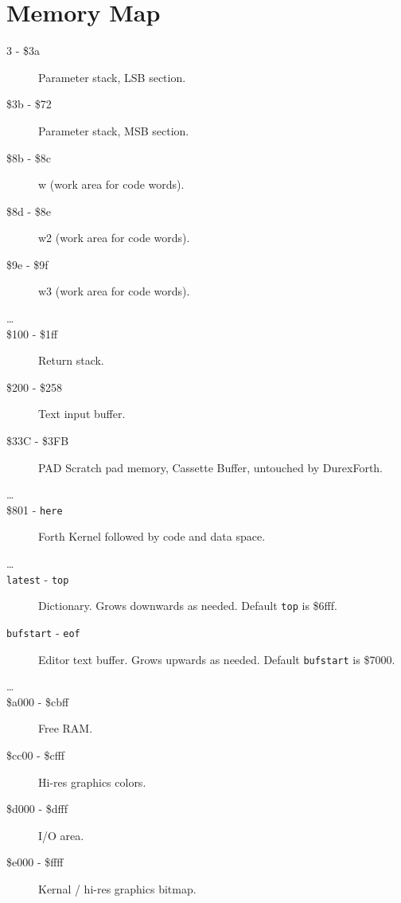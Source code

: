 \chapter{Memory Map}

\begin{description}
\item[3 - \$3a] Parameter stack, LSB section.
\item[\$3b - \$72] Parameter stack, MSB section.
\item[\$8b - \$8c] w (work area for code words).
\item[\$8d - \$8e] w2 (work area for code words).
\item[\$9e - \$9f] w3 (work area for code words).
\item[\ldots]
\item[\$100 - \$1ff] Return stack.
\item[\$200 - \$258] Text input buffer.
\item[\$33C - \$3FB] PAD Scratch pad memory, Cassette Buffer, untouched by DurexForth. 
\item[\ldots]
\item[\$801 - \texttt{here}] Forth Kernel followed by code and data space.
\item[\ldots]
\item[\texttt{latest} - \texttt{top}] Dictionary. Grows downwards as needed. Default \texttt{top} is \$6fff. 
\item[\texttt{bufstart} - \texttt{eof}] Editor text buffer. Grows upwards as needed. Default \texttt{bufstart} is \$7000.
\item[\ldots]
\item[\$a000 - \$cbff] Free RAM.
\item[\$cc00 - \$cfff] Hi-res graphics colors.
\item[\$d000 - \$dfff] I/O area. 
\item[\$e000 - \$ffff] Kernal / hi-res graphics bitmap.

\end{description}

